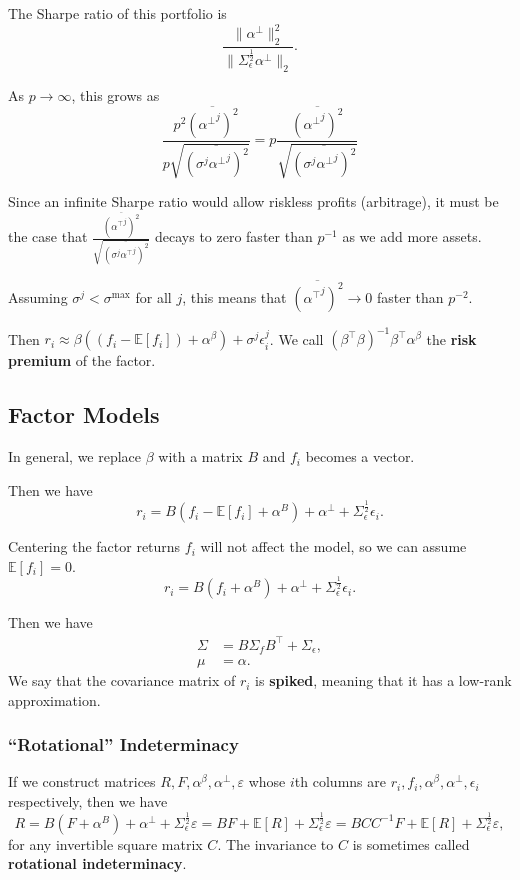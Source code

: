 \documentclass{article}
\begin{document}
The Sharpe ratio of this portfolio is
$$\frac{\|\alpha^\bot\|_2^2}{\|\Sigma_\epsilon^\frac{1}{2}\alpha^\bot\|_2}.$$

As $p\to\infty$, this grows as
$$\frac{p^2 \overline{({\alpha^\bot}^j)^2}}{p \sqrt{\overline{(\sigma^j {\alpha^\bot}^j)^2}}} = p \frac{\overline{({\alpha^\bot}^j)^2}}{\sqrt{\overline{(\sigma^j {\alpha^\bot}^j)^2}}} $$

Since an infinite Sharpe ratio would allow riskless profits (arbitrage), it must be the case that $\frac{\overline{({\alpha^\top}^j)^2}}{\sqrt{\overline{(\sigma^j{\alpha^\top}^j)^2}}}$ decays to zero faster than $p^{-1}$ as we add more assets.

Assuming $\sigma^j<\sigma^{\max}$ for all $j$, this means that $\overline{({\alpha^\top}^j)^2}\to 0$ faster than $p^{-2}$.

Then $r_i \approx \beta ((f_i-\mathbb{E}[f_i]) + \alpha^\beta) + \sigma^j\epsilon_i^j$. We call $(\beta^\top \beta)^{-1}\beta^\top\alpha^\beta$ the \textbf{risk premium} of the factor.


\subsection{Factor Models}
In general, we replace $\beta$ with a matrix $B$ and $f_i$ becomes a vector.

Then we have
$$r_i = B(f_i-\mathbb{E}[f_i] + \alpha^B) + \alpha^\bot + \Sigma_\epsilon^\frac{1}{2}\epsilon_i.$$

Centering the factor returns $f_i$ will not affect the model, so we can assume $\mathbb{E}[f_i]=0$.
$$r_i = B(f_i + \alpha^B) + \alpha^\bot + \Sigma_\epsilon^\frac{1}{2}\epsilon_i.$$

Then we have
\begin{align*}
	\Sigma	&= B \Sigma_f B^\top + \Sigma_\epsilon,
\\	\mu	&= \alpha.
\end{align*}
We say that the covariance matrix of $r_i$ is \textbf{spiked}, meaning that it has a low-rank approximation.

\subsubsection{``Rotational'' Indeterminacy}
If we construct matrices $R,F,\alpha^\beta,\alpha^\bot,\varepsilon$ whose $i$th columns are $r_i,f_i,\alpha^\beta,\alpha^\bot,\epsilon_i$ respectively, then we have
$$R = B(F + \alpha^B) + \alpha^\bot + \Sigma_\epsilon^\frac{1}{2}\varepsilon = BF + \mathbb{E}[R] + \Sigma_\epsilon^\frac{1}{2}\varepsilon = BCC^{-1}F + \mathbb{E}[R] + \Sigma_\epsilon^\frac{1}{2}\varepsilon,$$
for any invertible square matrix $C$. The invariance to $C$ is sometimes called \textbf{rotational indeterminacy}.
\end{document}
